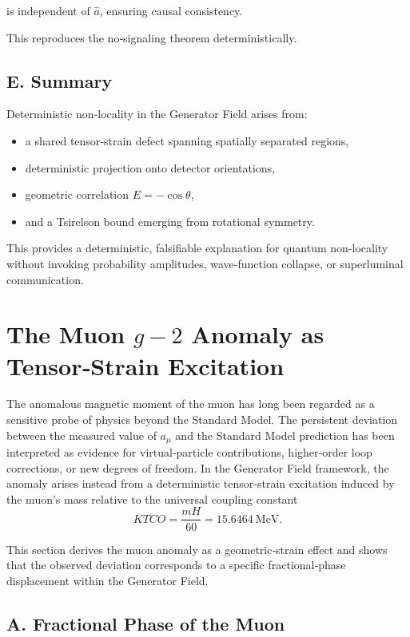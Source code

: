 \documentclass[reprint,amsmath,amssymb,aps,prl,floatfix]{revtex4-2}
\begin{document}
is independent of \(\hat{a}\), ensuring causal consistency.
\medskip

This reproduces the no‑signaling theorem deterministically.

\subsection{E. Summary}

Deterministic non‑locality in the Generator Field arises from:
\begin{itemize}
\item a shared tensor‑strain defect spanning spatially separated regions,  
\item deterministic projection onto detector orientations,  
\item geometric correlation \(E = -\cos\theta\),  
\item and a Tsirelson bound emerging from rotational symmetry.
\end{itemize}

This provides a deterministic, falsifiable explanation for quantum non‑locality without invoking probability amplitudes, wave‑function collapse, or superluminal communication.

\section{The Muon \(g-2\) Anomaly as Tensor‑Strain Excitation}

The anomalous magnetic moment of the muon has long been regarded as a sensitive probe of physics beyond the Standard Model. The persistent deviation between the measured value of \(a_\mu\) and the Standard Model prediction has been interpreted as evidence for virtual‑particle contributions, higher‑order loop corrections, or new degrees of freedom. In the Generator Field framework, the anomaly arises instead from a deterministic tensor‑strain excitation induced by the muon’s mass relative to the universal coupling constant  
\[
K{TCO} = \frac{mH}{60} = 15.6464\ \mathrm{MeV}.
\]

This section derives the muon anomaly as a geometric‑strain effect and shows that the observed deviation corresponds to a specific fractional‑phase displacement within the Generator Field.

\subsection{A. Fractional Phase of the Muon}
\end{document}
